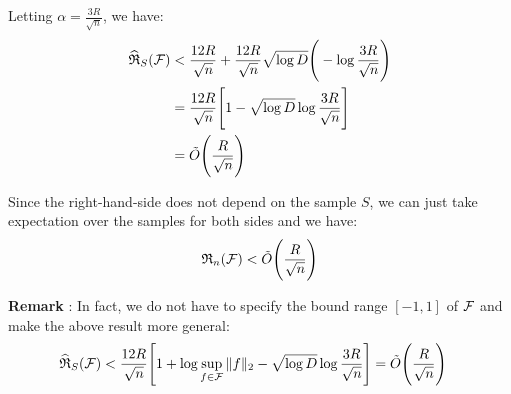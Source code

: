\begin{proof*}
    \noindent Letting $\alpha=\frac{3R}{\sqrt n}$, we have:
    \begin{align*}
        \widehat{\mathfrak{R}}_S(\mathcal{F}) &< \frac{12R}{\sqrt n} + \frac{12R}{\sqrt n}\sqrt{\log D} \Bigg(  - \log\frac{3R}{\sqrt n}  \Bigg) \\
        &= \frac{12R}{\sqrt n} \Bigg[ 
            1 - \sqrt{\log D}\log\frac{3R}{\sqrt{n}}
         \Bigg] \\
        &= \tilde O\Bigg(  \frac{R}{\sqrt n}  \Bigg)
    \end{align*}

    \noindent Since the right-hand-side does not depend on the sample $S$, we can just take expectation over the samples for both sides and we have:
    \begin{align*}
        \mathfrak{R}_n(\mathcal{F}) < \tilde O\Bigg(  \frac{R}{\sqrt n}  \Bigg)
    \end{align*}

    \noindent \textbf{Remark} : In fact, we do not have to specify the bound range $[-1, 1]$ of $\mathcal{F}$ and make the above result more general:
    \begin{align*}
        \widehat{\mathfrak{R}}_S(\mathcal{F}) &< \frac{12R}{\sqrt n}\Bigg[ 
            1 + \log\sup_{f\in\mathcal{F}}\|f\|_2 - \sqrt{\log D}\log\frac{3R}{\sqrt{n}}
         \Bigg] = \tilde O\Bigg(  \frac{R}{\sqrt n}  \Bigg)
    \end{align*}
\end{proof*}

